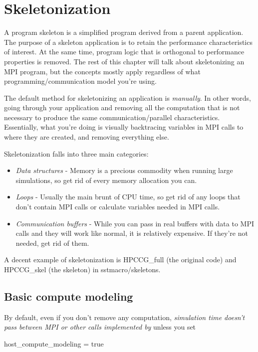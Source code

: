 \section{Skeletonization}

A program skeleton is a simplified program derived from a parent application. The purpose of a skeleton application is to retain the performance characteristics of interest. At the same time, program logic that is orthogonal to performance properties is removed.  The rest of this chapter will talk about skeletonizing an MPI program, but the concepts mostly apply regardless of what programming/communication model you're using. 

The default method for skeletonizing an application is \textit{manually}. In other words, going through your application and removing all the computation that is not necessary to produce the same communication/parallel characteristics.   Essentially, what you're doing is visually backtracing variables in MPI calls to where they are created, and removing everything else.  

Skeletonization falls into three main categories:

\begin{itemize}
\item \textit{Data structures} - Memory is a precious commodity when running large simulations, so get rid of every memory allocation you can.
\item \textit{Loops} - Usually the main brunt of CPU time, so get rid of any loops that don't contain MPI calls or calculate variables needed in MPI calls.
\item \textit{Communication buffers} - While you can pass in real buffers with data to \sstmacro MPI calls and they will work like normal, it is relatively expensive. If they're not needed, get rid of them.
\end{itemize}

A decent example of skeletonization is HPCCG\_full (the original code) and HPCCG\_skel (the skeleton) in sstmacro/skeletons.  

\subsection{Basic compute modeling}

By default, even if you don't remove any computation, \textit{simulation time doesn't pass between MPI or other calls implemented by \sstmacro} unless you set

\begin{ViFile}
host_compute_modeling = true
\end{ViFile}


